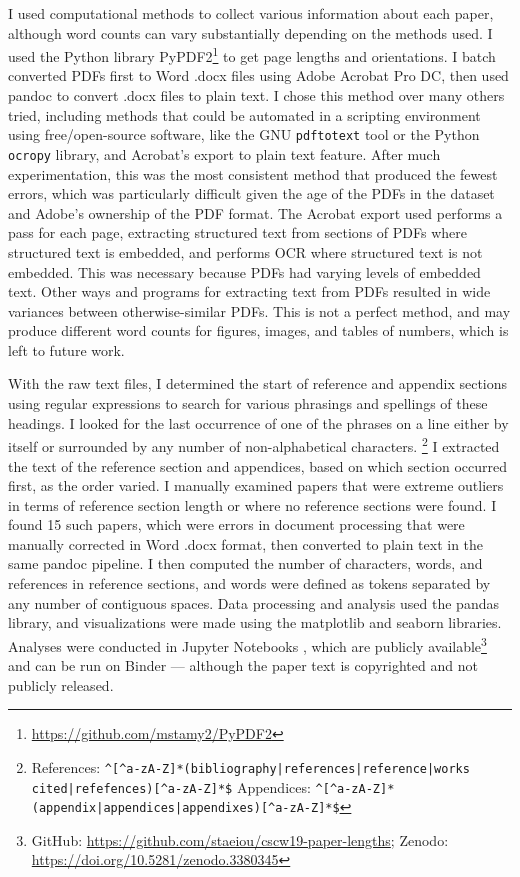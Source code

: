 \documentclass[format=acmsmall, screen=true]{acmart}
\begin{document}
I used computational methods to collect various information about each paper, although word counts can vary substantially depending on the methods used. I used the Python \cite{python} library PyPDF2\footnote{ \url{https://github.com/mstamy2/PyPDF2}} to get page lengths and orientations. I batch converted PDFs first to Word .docx files using Adobe Acrobat Pro DC, then used pandoc \cite{pandoc} to convert .docx files to plain text. I chose this method over many others tried, including methods that could be automated in a scripting environment using free/open-source software, like the GNU \texttt{pdftotext} tool or the Python \texttt{ocropy} library, and Acrobat's export to plain text feature. After much experimentation, this was the most consistent method that produced the fewest errors, which was particularly difficult given the age of the PDFs in the dataset and Adobe's ownership of the PDF format. The Acrobat export used performs a pass for each page, extracting structured text from sections of PDFs where structured text is embedded, and performs OCR where structured text is not embedded. This was necessary because PDFs had varying levels of embedded text. Other ways and programs for extracting text from PDFs resulted in wide variances between otherwise-similar PDFs. This is not a perfect method, and may produce different word counts for figures, images, and tables of numbers, which is left to future work.

With the raw text files, I determined the start of reference and appendix sections using regular expressions to search for various phrasings and spellings of these headings. I looked for the last occurrence of one of the phrases on a line either by itself or surrounded by any number of non-alphabetical characters. \footnote{ References: \texttt{\textasciicircum{}[\textasciicircum{}a-zA-Z]*(bibliography|references|reference|works cited|refefences)[\textasciicircum{}a-zA-Z]*\$} \newline
Appendices: \texttt{\textasciicircum{}[\textasciicircum{}a-zA-Z]*(appendix|appendices|appendixes)[\textasciicircum{}a-zA-Z]*\$} } I extracted the text of the reference section and appendices, based on which section occurred first, as the order varied. I manually examined papers that were extreme outliers in terms of reference section length or where no reference sections were found. I found 15 such papers, which were errors in document processing that were manually corrected in Word .docx format, then converted to plain text in the same pandoc pipeline. I then computed the number of characters, words, and references in reference sections, and words were defined as tokens separated by any number of contiguous spaces. Data processing and analysis used the pandas \cite{pandas} library, and visualizations were made using the matplotlib \cite{matplotlib} and seaborn \cite{seaborn} libraries. Analyses were conducted in Jupyter Notebooks \cite{jupyter}, which are publicly available\footnote{ GitHub: \url{https://github.com/staeiou/cscw19-paper-lengths}; Zenodo: \url{https://doi.org/10.5281/zenodo.3380345}} and can be run on Binder \cite{binder} --- although the paper text is copyrighted and not publicly released.
\end{document}
